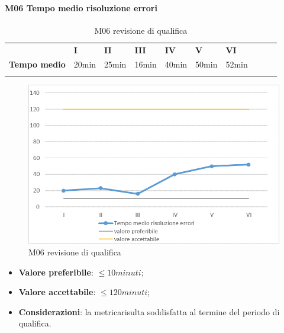 \paragraph{M06 Tempo medio risoluzione errori} \mbox{}
\begin{longtable}[H!] {						
		>{}p{50mm}  		
		>{}p{8mm}
		>{}p{8mm}		
		>{}p{8mm}		
		>{}p{8mm}		
		>{}p{8mm}		
		>{}p{8mm}
		>{}p{8mm}
		>{}p{8mm}
		>{}p{8mm}
	}
	\rowcolor{gray!50}
	\textbf{} & \textbf{I} & \textbf{II} & \textbf{III} & \textbf{IV} & \textbf{V} & \textbf{VI} \TBstrut \\ [2mm]
	\textbf{Tempo medio} & 20min & 25min & 16min & 40min & 50min & 52min \TBstrut \\ [2mm]
	\rowcolor{white}
	\caption{M06 revisione di qualifica}
\end{longtable}
\begin{figure}[H] 	
	\includegraphics[width=\linewidth]{./img/grafici/RQ6.png}	
	\caption{M06 revisione di qualifica}	
\end{figure}
\begin{itemize}
	\item \textbf{Valore preferibile}: $\le10minuti$;
	\item \textbf{Valore accettabile}: $\le120minuti$;
	\item \textbf{Considerazioni}: la metrica\glosp risulta soddisfatta al termine del periodo di qualifica.
\end{itemize}

